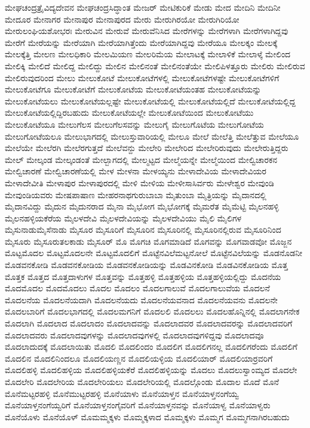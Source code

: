 {ಮೇಘಚಂದ್ರತ್ರೈವಿದ್ಯದೇವನ
ಮೇಘಚಂದ್ರಸಿದ್ಧಾಂತ
ಮೇಜರ್
ಮೇಟಿಕುರಿಕೆ
ಮೇಡು
ಮೇದ
ಮೇದಿನಿ
ಮೇದಿನೀ
ಮೇದೂರ
ಮೇನಾಗರ
ಮೇನಾಪುರ
ಮೇನಾಪುರದ
ಮೇರು
ಮೇರುಗಿರಯೋ
ಮೇರುಗಿರಿಯೋ
ಮೇರುಲಂಘಿಯಶೋಭರಃ
ಮೇರುವಿನ
ಮೇರುವೆ
ಮೇರುವೆನಿಸಿದ
ಮೇರೆಗಳನ್ನು
ಮೇರೆಗಳಾಗಿ
ಮೇರೆಗಳಾಗಿದ್ದವು
ಮೇರೆಗೆ
ಮೇರೆಯನ್ನು
ಮೇರೆಯಾಗಿ
ಮೇರೆಯಾಗಿತ್ತೆಂದು
ಮೇರೆಯಾಗಿದ್ದವು
ಮೇರೆಯೂ
ಮೇಲಕ್ಕಂ
ಮೇಲಕ್ಕೆ
ಮೇಲಕ್ಕೆತ್ತಿ
ಮೇಲಣ
ಮೇಲಧಿಕಾರಿ
ಮೇಲಮಿಯಣ
ಮೇಲರಿಮೆಯ
ಮೇಲಾಟಕ್ಕೆ
ಮೇಲಾಳಿಕೆ
ಮೇಲಾಳ್ಕೆ
ಮೇಲಿಂದ
ಮೇಲಿಕ್ಕಿ
ಮೇಲಿದೆ
ಮೇಲಿದ್ದ
ಮೇಲಿದ್ದು
ಮೇಲಿನ
ಮೇಲಿನಂತೆ
ಮೇಲಿನಂತೆಯೇ
ಮೇಲಿಪಿಳತ್ತೂರು
ಮೇಲಿರು
ಮೇಲಿರುವ
ಮೇಲಿರುವುದರಿಂದ
ಮೇಲು
ಮೇಲುಕೋಟೆ
ಮೇಲುಕೋಟೆಗಳಲ್ಲಿ
ಮೇಲುಕೋಟೆಗಳಷ್ಟೇ
ಮೇಲುಕೋಟೆಗಳಿಗೆ
ಮೇಲುಕೋಟೆಗೂ
ಮೇಲುಕೋಟೆಗೆ
ಮೇಲುಕೋಟೆಯ
ಮೇಲುಕೋಟೆಯಂತಹ
ಮೇಲುಕೋಟೆಯನ್ನು
ಮೇಲುಕೋಟೆಯಲು
ಮೇಲುಕೋಟೆಯಲ್ಲಷ್ಟೇ
ಮೇಲುಕೋಟೆಯಲ್ಲಿ
ಮೇಲುಕೋಟೆಯಲ್ಲಿದೆ
ಮೇಲುಕೋಟೆಯಲ್ಲಿದ್ದ
ಮೇಲುಕೋಟೆಯಲ್ಲಿದ್ದಿರಬಹುದು
ಮೇಲುಕೋಟೆಯಲ್ಲೇ
ಮೇಲುಕೋಟೆಯಿಂದ
ಮೇಲುಕೋಟೆಯು
ಮೇಲುಕೋಟೆಯೂ
ಮೇಲುಗೆಲಸ
ಮೇಲುಗೆಲಸವನ್ನು
ಮೇಲುಗೈ
ಮೇಲುಗೊಟೆಯ
ಮೇಲುಗೋಟೆಯ
ಮೇಲುಗೋಟೆಯಲೂ
ಮೇಲುಭಾಗದಲ್ಲಿ
ಮೇಲುಸ್ತುವಾರಿಯಲ್ಲಿ
ಮೇಲೂ
ಮೇಲೆ
ಮೇಲೆತ್ತಿ
ಮೇಲೆತ್ತುವ
ಮೇಲೆಯೂ
ಮೇಲೆಯೇ
ಮೇಲೆರಗಿ
ಮೇಲೆರಗುತ್ತದೆ
ಮೇಲೆವನ್ದು
ಮೇಲೇರಿ
ಮೇಲೇರಿದ
ಮೇಲೇರಿರುವುದು
ಮೇಲೇರುತ್ತಿದ್ದರು
ಮೇಲ್
ಮೇಲ್ಕಂಡ
ಮೇಲ್ಕಂಡಂತೆ
ಮೇಲ್ಬಾಗದಲ್ಲಿ
ಮೇಲ್ಮಟ್ಟದ
ಮೇಲ್ಮೆಯನ್ನೇ
ಮೇಲ್ಮೆಯಿಂದ
ಮೇಲ್ವಿಚಾರಕನ
ಮೇಲ್ವಿಚಾರಣೆ
ಮೇಲ್ವಿಚಾರಣೆಯಲ್ಲಿ
ಮೇಳ
ಮೇಳನಾ
ಮೇಳಯ್ಯನು
ಮೇಳಾದೇವಿಯ
ಮೇಳಾದೇವಿಯರ
ಮೇಳಾದೇವೀತಿ
ಮೇಳಾಪುರ
ಮೇಳಾಪುರದಲ್ಲಿ
ಮೇಳಿ
ಮೇಳಿಯ
ಮೇಳೀಸಾಸಿರ್ವರು
ಮೇಳೇಶ್ವರ
ಮೇವುಂಡಿ
ಮೇವುಂಡಿಯವರು
ಮೇಷಪಾಷಾಣ
ಮೇಹರನಾಥಗುರುಬಾಬಾ
ಮೈತುಂಬಾ
ಮೈತ್ರಿಯನ್ನು
ಮೈದಾನದಲ್ಲಿ
ಮೈದಾನವಿದ್ದು
ಮೈದುನ
ಮೈದುನರಾದ
ಮೈನಾ
ಮೈಭೋಗ
ಮೈಭೋಗಕ್ಕೆ
ಮೈಮರೆತ
ಮೈಮೆಟ್ಟಿ
ಮೈಲನಹಳ್ಳಿ
ಮೈಲನಹಳ್ಳಿಯಕೆರೆಯ
ಮೈಲಳದೇವಿ
ಮೈಲಳದೇವಿಯನ್ನು
ಮೈಲಳದೇವಿಯು
ಮೈಲಿ
ಮೈಲಿಗಳ
ಮೈಸುನಾಡುಮೈಸೆನಾಡು
ಮೈಸೂರ
ಮೈಸೂರಿಗೆ
ಮೈಸೂರಿನ
ಮೈಸೂರಿನಲ್ಲಿ
ಮೈಸೂರಿನಲ್ಲಿರುವ
ಮೈಸೂರಿನಿಂದ
ಮೈಸೂರು
ಮೈಸೂರುತಲಕಾಡು
ಮೈಸೂರ್
ಮೊ
ಮೊಗಚಿ
ಮೊಗಮಾಡಿದೆ
ಮೊಗವನ್ನು
ಮೊಗವಾಡವೋ
ಮೊಜ್ಜನ
ಮೊಟ್ಟಮೊದಲ
ಮೊಟ್ಟಮೊದಲನೇ
ಮೊಟ್ಟಮೊದಲಿಗೆ
ಮೊಟ್ಟೆನವಿಲೆಮಟ್ಟನೋಲೆ
ಮೊಟ್ಟೆನವಿಲೆಯನ್ನು
ಮೊಡನೊಡನೀ
ಮೊಡವನಕೋಡಿ
ಮೊಡವನಕೋಡಿಯ
ಮೊಡವನಕೋಡಿಯನ್ನು
ಮೊಡವಿನಕೋಡಿ
ಮೊಡವಿನಕೋಡಿಯ
ಮೊತ್ತ
ಮೊತ್ತಕ
ಮೊತ್ತದ
ಮೊತ್ತದಾಳುಗಳ
ಮೊತ್ತವನ್ನು
ಮೊತ್ತಹಳ್ಳಿ
ಮೊತ್ತಹಳ್ಳಿಯ
ಮೊತ್ತಹಳ್ಳಿಯಲ್ಲಿದ್ದು
ಮೊದನೆಯ
ಮೊದಮೊದಲ
ಮೊದಮೊದಲು
ಮೊದಲ
ಮೊದಲಂ
ಮೊದಲಗಾಲುವೆ
ಮೊದಲಗಾಲುವೆಯ
ಮೊದಲನೆ
ಮೊದಲನೆಯ
ಮೊದಲನೆಯದಾಗಿ
ಮೊದಲನೆಯದು
ಮೊದಲನೆಯವನಾದ
ಮೊದಲನೆಯವನು
ಮೊದಲನೇ
ಮೊದಲಬಾರಿಗೆ
ಮೊದಲಭಾಗದಲ್ಲಿ
ಮೊದಲಮಗನಿಗೆ
ಮೊದಲಲಿ
ಮೊದಲಲು
ಮೊದಲಹೊನ್ನಿನಲ್ಲಿ
ಮೊದಲಾಗನೇಕ
ಮೊದಲಾಗಿ
ಮೊದಲಾದ
ಮೊದಲಾದಂ
ಮೊದಲಾದವನ್ನು
ಮೊದಲಾದವರ
ಮೊದಲಾದವರನ್ನು
ಮೊದಲಾದವರಿಗೆ
ಮೊದಲಾದವರು
ಮೊದಲಾದವುಗಳನ್ನು
ಮೊದಲಾದವುಗಳಲ್ಲಿ
ಮೊದಲಾದವುಗಳಿದ್ದವು
ಮೊದಲಾದವೂ
ಮೊದಲಾದುದಕ್ಕೆ
ಮೊದಲಾಯಿತು
ಮೊದಲಿ
ಮೊದಲಿಂದಂ
ಮೊದಲಿಗ
ಮೊದಲಿಗನಲ್ಲ
ಮೊದಲಿಗರೆಂದು
ಮೊದಲಿಗೆ
ಮೊದಲಿನ
ಮೊದಲಿನಿಂದಲೂ
ಮೊದಲಿಯಣ್ಣನ
ಮೊದಲಿಯಳ್ಳಿಯ
ಮೊದಲಿಯಾರ್
ಮೊದಲಿಯಾರ್ರವರಿಗೆ
ಮೊದಲಿಹಳ್ಳಿ
ಮೊದಲಿಹಳ್ಳಿಯ
ಮೊದಲಿಹಳ್ಳಿಯಕೆರೆ
ಮೊದಲಿಹಳ್ಳಿಯನ್ನು
ಮೊದಲು
ಮೊದಲುಸ್ವಾಂಮ್ಯದ
ಮೊದಲೇ
ಮೊದಲೇರಿ
ಮೊದಲೇರಿಯ
ಮೊದಲೇರಿಯಲು
ಮೊದಲೇರಿಯಲ್ಲಿ
ಮೊದಲ್ಗೊಂಡು
ಮೊದಾಲ
ಮೊದೆ
ಮೊನೆ
ಮೊನೆಮಟ್ಟರಹಳ್ಳಿ
ಮೊನೆಮುಟ್ಟರಹಳ್ಳಿ
ಮೊನೆಯಾಳು
ಮೊನೆಯಾಳ್ತನ
ಮೊನೆಯಾಳ್ತನಂಗೆಯ್ವ
ಮೊನೆಯಾಳ್ತನಂಗೆಯ್ವರಿಗೆ
ಮೊನೆಯಾಳ್ತನಂಗೈವರಿಗೆ
ಮೊನೆಯಾಳ್ತನವನ್ನು
ಮೊನೆಯಾಳ್ವ
ಮೊನೆಯಾಳ್ವರು
ಮೊನೆಯೊಳು
ಮೊನೆಯೊಳ್
ಮೊಮಮ್ಮಕ್ಕಳು
ಮೊಮ್ಮಕ್ಕಳಾದ
ಮೊಮ್ಮಕ್ಕಳು
ಮೊಮ್ಮಗ
ಮೊಮ್ಮಗನಾಗಿರಬಹುದು
}
